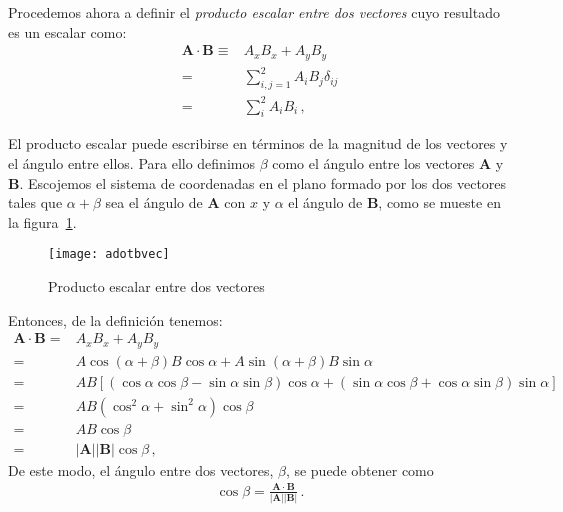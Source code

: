 \begin{frame}
Procedemos ahora a definir el \emph{producto escalar entre dos vectores} cuyo resultado es un escalar como:
\begin{align}
  \mathbf{A}\cdot\mathbf{B}\equiv&A_xB_x+A_yB_y\nonumber\\
  =&\sum_{i,j=1}^2A_iB_j\delta_{ij}\nonumber\\
  =&\sum_{i}^2A_iB_i\,,
\end{align}

El producto escalar puede escribirse en términos de la magnitud de los
vectores y el ángulo entre ellos. Para ello definimos $\beta$ como el
\'angulo entre los vectores $\mathbf{A}$ y $\mathbf{B}$. Escojemos el
sistema de coordenadas en el plano formado por los dos vectores tales
que $\alpha+\beta$ sea el \'angulo de $\mathbf{A}$ con $x$ y $\alpha$
el \'angulo de $\mathbf{B}$, como se mueste en la figura~\ref{fig:adotbvec}. 

\begin{figure}
  \centering
  \texttt{[image: adotbvec]}
  \caption{Producto escalar entre dos vectores}
  \label{fig:adotbvec}
\end{figure}

Entonces, de la definici\'on tenemos:
\begin{align}
    \mathbf{A}\cdot\mathbf{B}=&A_xB_x+A_yB_y\nonumber\\
    =&A\cos(\alpha+\beta)B\cos\alpha+A\sin(\alpha+\beta)B\sin\alpha\nonumber\\
    =&AB[(\cos\alpha\cos\beta-\sin\alpha\sin\beta)\cos\alpha+(\sin\alpha\cos\beta+\cos\alpha\sin\beta)\sin\alpha]\nonumber\\
    =&AB(\cos^2\alpha+\sin^2\alpha)\cos\beta\nonumber\\
    =&AB\cos\beta\nonumber\\
    =&|\mathbf{A}||\mathbf{B}|\cos\beta\,,
\end{align}
De este modo, el \'angulo entre dos vectores,
$\beta$, se puede obtener como
\begin{align}
  \cos\beta=\frac{\mathbf{A}\cdot\mathbf{B}}{|\mathbf{A}||\mathbf{B}|}\,.
\end{align}
\end{frame}


